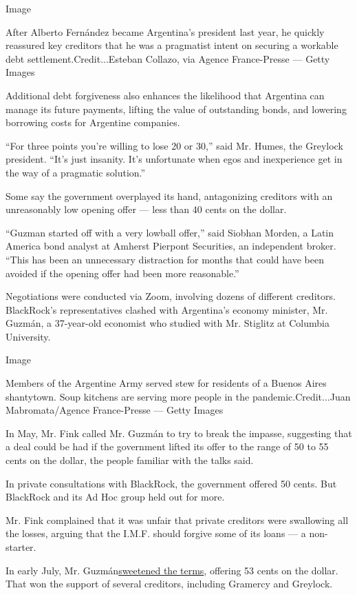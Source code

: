 Image

After Alberto Fernández became Argentina's president last year, he
quickly reassured key creditors that he was a pragmatist intent on
securing a workable debt settlement.Credit...Esteban Collazo, via Agence
France-Presse --- Getty Images

Additional debt forgiveness also enhances the likelihood that Argentina
can manage its future payments, lifting the value of outstanding bonds,
and lowering borrowing costs for Argentine companies.

``For three points you're willing to lose 20 or 30,'' said Mr. Humes,
the Greylock president. ``It's just insanity. It's unfortunate when egos
and inexperience get in the way of a pragmatic solution.''

Some say the government overplayed its hand, antagonizing creditors with
an unreasonably low opening offer --- less than 40 cents on the dollar.

``Guzman started off with a very lowball offer,'' said Siobhan Morden, a
Latin America bond analyst at Amherst Pierpont Securities, an
independent broker. ``This has been an unnecessary distraction for
months that could have been avoided if the opening offer had been more
reasonable.''

Negotiations were conducted via Zoom, involving dozens of different
creditors. BlackRock's representatives clashed with Argentina's economy
minister, Mr. Guzmán, a 37-year-old economist who studied with Mr.
Stiglitz at Columbia University.

Image

Members of the Argentine Army served stew for residents of a Buenos
Aires shantytown. Soup kitchens are serving more people in the
pandemic.Credit...Juan Mabromata/Agence France-Presse --- Getty Images

In May, Mr. Fink called Mr. Guzmán to try to break the impasse,
suggesting that a deal could be had if the government lifted its offer
to the range of 50 to 55 cents on the dollar, the people familiar with
the talks said.

In private consultations with BlackRock, the government offered 50
cents. But BlackRock and its Ad Hoc group held out for more.

Mr. Fink complained that it was unfair that private creditors were
swallowing all the losses, arguing that the I.M.F. should forgive some
of its loans --- a non-starter.

In early July, Mr.
Guzmán\href{https://www.reuters.com/article/argentina-debt-proposal/argentina-unveils-sweetened-debt-offer-to-creditors-sets-aug-4-deadline-idUSE6N2BD07N}{sweetened
the terms}, offering 53 cents on the dollar. That won the support of
several creditors, including Gramercy and Greylock.

